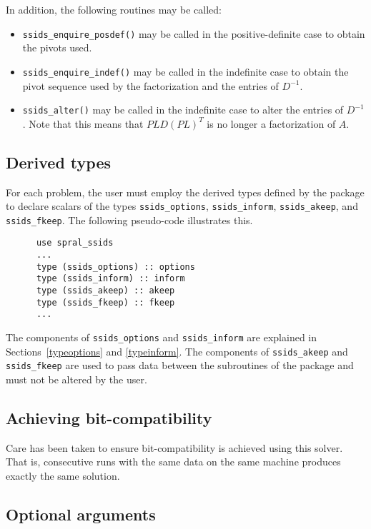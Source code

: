 \noindent
In addition, the following routines may be called:
\begin{itemize}
\item {\tt ssids\_enquire\_posdef()} may be called
in the  positive-definite case to obtain the pivots used.
\item {\tt ssids\_enquire\_indef()} may be called
in the indefinite case to obtain the pivot sequence used by the factorization
and the entries of  ${D}^{-1}$.
\item {\tt ssids\_alter()} may be called in the indefinite case to alter
the entries of ${D}^{-1}$.
Note that this means that  $PLD(PL)^T$ is no longer
a factorization of $A$.

\end{itemize}


\subsection{Derived types} \label{derived types}

For each problem, the user must employ the derived types defined by the
package to declare scalars of the types
{\tt ssids\_options}, {\tt ssids\_inform}, {\tt ssids\_akeep}, and {\tt ssids\_fkeep}.
The following pseudo-code illustrates this.
\begin{verbatim}
      use spral_ssids
      ...
      type (ssids_options) :: options
      type (ssids_inform) :: inform
      type (ssids_akeep) :: akeep
      type (ssids_fkeep) :: fkeep
      ...
\end{verbatim}
The components of {\tt ssids\_options} and {\tt ssids\_inform} are explained
in Sections~\ref{typeoptions} and \ref{typeinform}.
The components of {\tt ssids\_akeep} and {\tt ssids\_fkeep} are used to pass
data between the subroutines of the package and must not be altered by the user.

\subsection{Achieving bit-compatibility} \label{bitcompat}
Care has been taken to ensure bit-compatibility is achieved using this solver.
That is, consecutive runs with the same data on the same machine  produces exactly
the same solution.

\subsection{Optional arguments}\label{Optional arguments}

